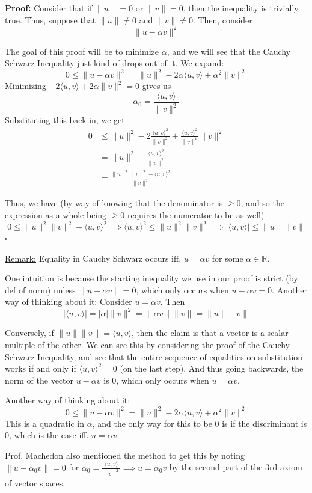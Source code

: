 \documentclass{article}
\newcommand*{\qed}{\hfill$\square$}%
\newcommand*{\iprod}[1]{\langle #1 \rangle}
\newcommand*{\rr}{\mathbb{R}}%
\begin{document}
\textbf{Proof:} Consider that if $\|u\|=0$ or $\|v\|=0$, then the inequality is trivially true. Thus, suppose that $\|u\|\neq 0$ and $\|v\|\neq 0$. Then, consider \[
    \|u-\alpha v\|^2
\]

The goal of this proof will be to minimize $\alpha$, and we will see that the Cauchy Schwarz Inequality just kind of drops out of it. We expand: \[
    0\leq\|u-\alpha v\|^2 = \|u\|^2 - 2\alpha\iprod{u,v} + \alpha^2\|v\|^2
\] 
Minimizing $-2\iprod{u,v}+2\alpha \|v\|^2=0$ gives us \[
    \alpha_0=\frac{\iprod{u,v}}{\|v\|^2}
\]
Substituting this back in, we get \begin{align*}
    0&\leq\|u\|^2 - 2\frac{\iprod{u,v}^2}{\|v\|^2}+\frac{\iprod{u,v}^2}{\|v\|^4}\|v\|^2 \\&= \|u\|^2 - \frac{\iprod{u,v}^2}{\|v\|^2}\\&= \frac{\|u\|^2\|v\|^2-\iprod{u,v}^2}{\|v\|^2}
\end{align*}

Thus, we have (by way of knowing that the denominator is $\geq 0$, and so the expression as a whole being $\geq 0$ requires the numerator to be as well)\[
    0\leq\|u\|^2\|v\|^2-\iprod{u,v}^2 \implies \iprod{u,v}^2\leq\|u\|^2\|v\|^2 \implies |\iprod{u,v}|\leq\|u\|\|v\|
\]
\qed 

\underline{Remark:} Equality in Cauchy Schwarz occurs iff. $u=\alpha v$ for some $\alpha\in\rr$.

One intuition is because the starting inequality we use in our proof is strict (by def of norm) unless $\|u-\alpha v\|=0$, which only occurs when $u-\alpha v=0$. Another way of thinking about it: Consider $u=\alpha v$. Then \[
    |\iprod{u,v}|=|\alpha|\|v\|^2=\|\alpha v\|\|v\| = \|u\|\|v\|
\]

Conversely, if $\|u\|\|v\|=\iprod{u,v}$, then the claim is that a vector is a scalar multiple of the other. We can see this by considering the proof of the Cauchy Schwarz Inequality, and see that the entire sequence of equalities on substitution works if and only if $\iprod{u,v}^2=0$ (on the last step). And thus going backwards, the norm of the vector $u-\alpha v$ is 0, which only occurs when $u=\alpha v$.

Another way of thinking about it: \[
    0\leq\|u-\alpha v\|^2 = \|u\|^2 - 2\alpha\iprod{u,v} + \alpha^2\|v\|^2
\]
This is a quadratic in $\alpha$, and the only way for this to be 0 is if the discriminant is 0, which is the case iff. $u=\alpha v$.

Prof. Machedon also mentioned the method to get this by noting $\|u-\alpha_0 v\|=0$ for $\alpha_0=\frac{\iprod{u,v}}{\|v\|^2}\implies u=\alpha_0 v$ by the second part of the 3rd axiom of vector spaces.
\end{document}
